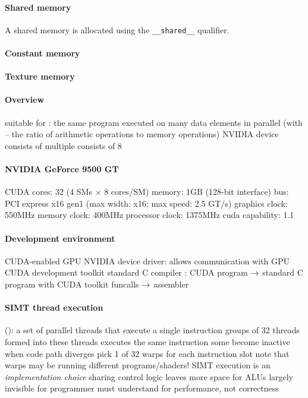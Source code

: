 \documentclass{myart}
\begin{document}
\paragraph{Shared memory}
\bit
\w A shared memory is allocated using the \verb+__shared__+ qualifier.
\eit


\paragraph{Constant memory}

\paragraph{Texture memory}



\paragraph{Overview}
\bit
\w suitable for : the same program executed on
many data elements in parallel (with  -- the
ratio of arithmetic operations to memory operations)
\w NVIDIA device consists of multiple 
\w {} consists of 8 
\eit

\paragraph{NVIDIA GeForce 9500 GT}
\bit
\w CUDA cores: 32 (4 SMs $\times$ 8 cores/SM)
\w memory: 1GB (128-bit interface)
\w bus: PCI express x16 gen1 (max width: x16; max speed: 2.5 GT/s)
\w graphics clock: 550MHz
\w memory clock: 400MHz
\w processor clock: 1375MHz
\w cuda capability: 1.1
\eit

\paragraph{Development environment}
\bit
\w CUDA-enabled GPU
\w NVIDIA device driver: allows communication with GPU
\w CUDA development toolkit
\w standard C compiler
\w {}: CUDA program $\mbox{$\rightarrow$}$ standard C program with CUDA toolkit funcalls
$\mbox{$\rightarrow$}$ assembler
  
\eit

\paragraph{SIMT thread execution}
\bit
\w {} (): a set of parallel threads that execute a single instruction
  \bit
  \w groups of 32 threads formed into 
  \w these threads executes the same instruction
  \w some become inactive when code path diverges
  \eit
\w {}
  \bit
  \w pick 1 of 32 warps for each instruction slot
  \w note that warps may be running different programs/shaders!
  \eit
\w SIMT execution is an {\em implementation choice}
  \bit
  \w sharing control logic leaves more space for ALUs
  \w largely invisible for programmer
  \w must understand for performance, not correctness
  \eit
\eit
\end{document}
